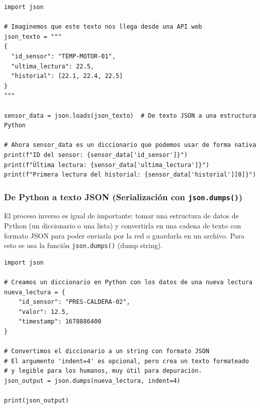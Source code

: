 \begin{lstlisting}[style=PythonStyle, caption={Deserializando un string JSON a un diccionario de Python.}]
import json

# Imaginemos que este texto nos llega desde una API web
json_texto = """
{
  "id_sensor": "TEMP-MOTOR-01",
  "ultima_lectura": 22.5,
  "historial": [22.1, 22.4, 22.5]
}
"""

sensor_data = json.loads(json_texto)  # De texto JSON a una estructura Python

# Ahora sensor_data es un diccionario que podemos usar de forma nativa
print(f"ID del sensor: {sensor_data['id_sensor']}")
print(f"Última lectura: {sensor_data['ultima_lectura']}")
print(f"Primera lectura del historial: {sensor_data['historial'][0]}")
\end{lstlisting}

\subsubsection{De Python a texto JSON (Serialización con \texttt{json.dumps()})}

El proceso inverso es igual de importante: tomar una estructura de datos de Python (un diccionario o una lista) y convertirla en una cadena de texto con formato JSON para poder enviarla por la red o guardarla en un archivo. Para esto se usa la función \texttt{json.dumps()} (dump string).

\begin{lstlisting}[style=PythonStyle, caption={Serializando un diccionario de Python a un string JSON.}]
import json

# Creamos un diccionario en Python con los datos de una nueva lectura
nueva_lectura = {
    "id_sensor": "PRES-CALDERA-02",
    "valor": 12.5,
    "timestamp": 1678886400
}

# Convertimos el diccionario a un string con formato JSON
# El argumento 'indent=4' es opcional, pero crea un texto formateado
# y legible para los humanos, muy útil para depuración.
json_output = json.dumps(nueva_lectura, indent=4)

print(json_output)
\end{lstlisting}

